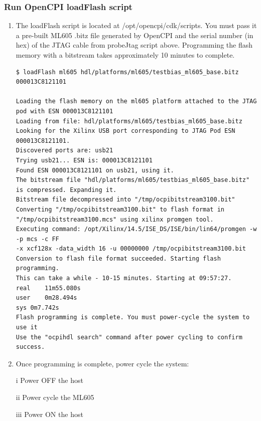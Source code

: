 \subsubsection{Run OpenCPI loadFlash script}
\begin{enumerate}
	\item The loadFlash script is located at
	/opt/opencpi/cdk/scripts. You must pass it a pre-built ML605
	.bitz file generated by OpenCPI and the serial number (in hex)
	of the JTAG cable from probeJtag script above. Programming the
	flash memory with a bitstream takes approximately 10 minutes to
	complete.\par\smallskip
	\par
	\noindent{}
	\par\smallskip

	\smallskip
	\begin{verbatim}
$ loadFlash ml605 hdl/platforms/ml605/testbias_ml605_base.bitz 000013C8121101

Loading the flash memory on the ml605 platform attached to the JTAG pod with ESN 000013C8121101
Loading from file: hdl/platforms/ml605/testbias_ml605_base.bitz
Looking for the Xilinx USB port corresponding to JTAG Pod ESN 000013C8121101.
Discovered ports are: usb21
Trying usb21... ESN is: 000013C8121101
Found ESN 000013C8121101 on usb21, using it.
The bitstream file "hdl/platforms/ml605/testbias_ml605_base.bitz" is compressed. Expanding it.
Bitstream file decompressed into "/tmp/ocpibitstream3100.bit"
Converting "/tmp/ocpibitstream3100.bit" to flash format in
"/tmp/ocpibitstream3100.mcs" using xilinx promgen tool.
Executing command: /opt/Xilinx/14.5/ISE_DS/ISE/bin/lin64/promgen -w -p mcs -c FF
-x xcf128x -data_width 16 -u 00000000 /tmp/ocpibitstream3100.bit
Conversion to flash file format succeeded. Starting flash programming.
This can take a while - 10-15 minutes. Starting at 09:57:27.
real	11m55.080s
user	0m28.494s
sys	0m7.742s
Flash programming is complete. You must power-cycle the system to use it
Use the "ocpihdl search" command after power cycling to confirm success.
	\end{verbatim}
	\item Once programming is complete, power cycle the system:
	\item[i]Power OFF the host
	\item[ii]Power cycle the ML605
	\item[iii]Power ON the host
\end{enumerate}

